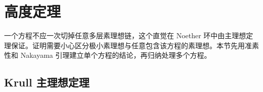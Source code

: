 
\section{高度定理}
\label{b3:sec:0902}

一个方程不应一次切掉任意多层素理想链，这个直觉在 Noether 环中由主理想定理保证。证明需要小心区分极小素理想与任意包含该方程的素理想。本节先用准素性和 Nakayama 引理建立单个方程的结论，再归纳处理多个方程。

\subsection{Krull 主理想定理}
\label{b3:subsec:0902:01}

